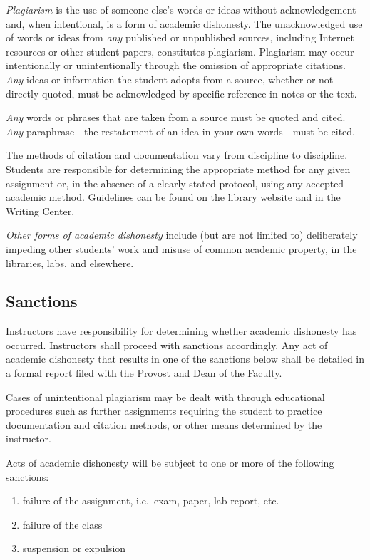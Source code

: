\documentclass[
  letterpaper,
]{scrbook}
\providecommand{\tightlist}{%
  \setlength{\itemsep}{0pt}\setlength{\parskip}{0pt}}
\begin{document}
\emph{Plagiarism} is the use of someone else's words or ideas without
acknowledgement and, when intentional, is a form of academic dishonesty.
The unacknowledged use of words or ideas from \emph{any} published or
unpublished sources, including Internet resources or other student
papers, constitutes plagiarism. Plagiarism may occur intentionally or
unintentionally through the omission of appropriate citations.
\emph{Any} ideas or information the student adopts from a source,
whether or not directly quoted, must be acknowledged by specific
reference in notes or the text.

\emph{Any} words or phrases that are taken from a source must be quoted
and cited. \emph{Any} paraphrase---the restatement of an idea in your
own words---must be cited.

The methods of citation and documentation vary from discipline to
discipline. Students are responsible for determining the appropriate
method for any given assignment or, in the absence of a clearly stated
protocol, using any accepted academic method. Guidelines can be found on
the library website and in the Writing Center.

\emph{Other forms of academic dishonesty} include (but are not limited
to) deliberately impeding other students' work and misuse of common
academic property, in the libraries, labs, and elsewhere.

\subsection{Sanctions}\label{sanctions}

Instructors have responsibility for determining whether academic
dishonesty has occurred. Instructors shall proceed with sanctions
accordingly. Any act of academic dishonesty that results in one of the
sanctions below shall be detailed in a formal report filed with the
Provost and Dean of the Faculty.

Cases of unintentional plagiarism may be dealt with through educational
procedures such as further assignments requiring the student to practice
documentation and citation methods, or other means determined by the
instructor.

Acts of academic dishonesty will be subject to one or more of the
following sanctions:

\begin{enumerate}
\def\labelenumi{\arabic{enumi}.}
\tightlist
\item
  failure of the assignment, i.e.~exam, paper, lab report, etc.
\item
  failure of the class
\item
  suspension or expulsion
\end{enumerate}
\end{document}
